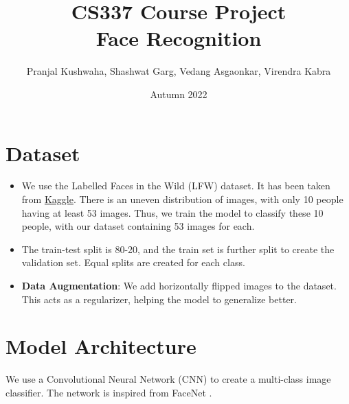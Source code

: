 \documentclass{article}
\title{\textbf{CS337 Course Project \\ Face Recognition}}
\author{Pranjal Kushwaha, Shashwat Garg, Vedang Asgaonkar, Virendra Kabra}
\date{Autumn 2022}
\newcommand{\B}[1]{\textbf{#1}}
\begin{document}
\begin{sloppypar}       %

    \maketitle
    \tableofcontents

    \newpage

    \section{Dataset}
    
        \begin{itemize}
            \item We use the Labelled Faces in the Wild (LFW) dataset. It has been taken from \href{https://www.kaggle.com/datasets/jessicali9530/lfw-dataset}{Kaggle}. There is an uneven distribution of images, with only 10 people having at least 53 images. Thus, we train the model to classify these 10 people, with our dataset containing 53 images for each.
            \item The train-test split is 80-20, and the train set is further split to create the validation set. Equal splits are created for each class.
            \item \B{Data Augmentation}: We add horizontally flipped images to the dataset. This acts as a regularizer, helping the model to generalize better.
        \end{itemize}
    

        \section{Model Architecture}

        We use a Convolutional Neural Network (CNN) to create a multi-class image classifier. The network is inspired from FaceNet \cite{facenet}.


\end{sloppypar}
\end{document}

